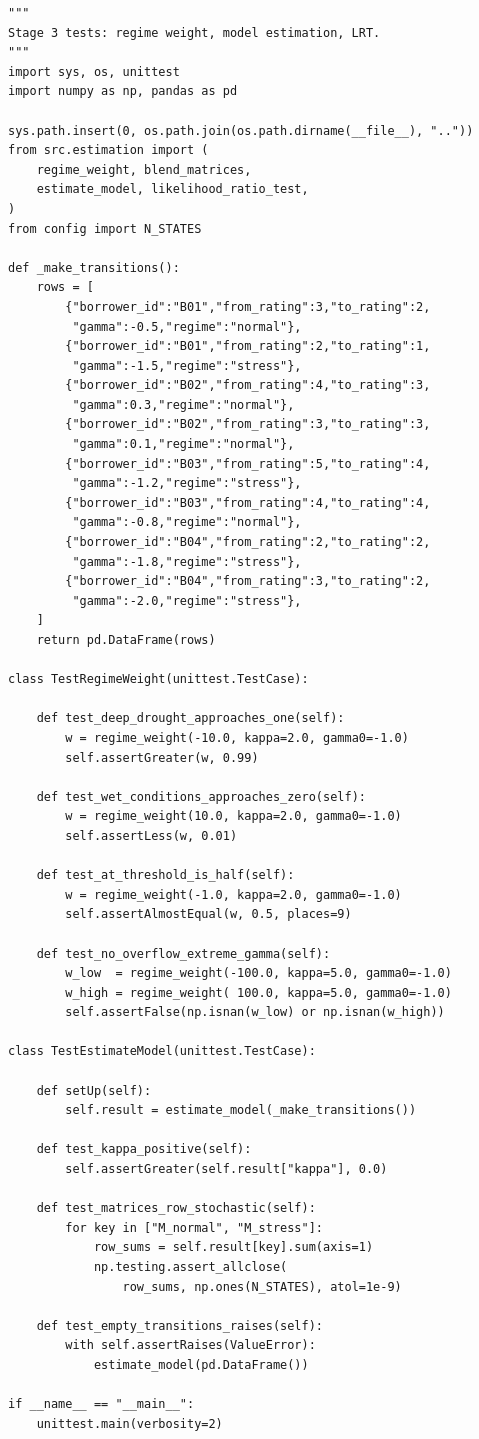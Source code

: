 \documentclass[12pt,a4paper]{article}
\begin{document}
\begin{lstlisting}[caption={test\_estimation.py --- Stage 3: Model Estimation}]
"""
Stage 3 tests: regime weight, model estimation, LRT.
"""
import sys, os, unittest
import numpy as np, pandas as pd

sys.path.insert(0, os.path.join(os.path.dirname(__file__), ".."))
from src.estimation import (
    regime_weight, blend_matrices,
    estimate_model, likelihood_ratio_test,
)
from config import N_STATES

def _make_transitions():
    rows = [
        {"borrower_id":"B01","from_rating":3,"to_rating":2,
         "gamma":-0.5,"regime":"normal"},
        {"borrower_id":"B01","from_rating":2,"to_rating":1,
         "gamma":-1.5,"regime":"stress"},
        {"borrower_id":"B02","from_rating":4,"to_rating":3,
         "gamma":0.3,"regime":"normal"},
        {"borrower_id":"B02","from_rating":3,"to_rating":3,
         "gamma":0.1,"regime":"normal"},
        {"borrower_id":"B03","from_rating":5,"to_rating":4,
         "gamma":-1.2,"regime":"stress"},
        {"borrower_id":"B03","from_rating":4,"to_rating":4,
         "gamma":-0.8,"regime":"normal"},
        {"borrower_id":"B04","from_rating":2,"to_rating":2,
         "gamma":-1.8,"regime":"stress"},
        {"borrower_id":"B04","from_rating":3,"to_rating":2,
         "gamma":-2.0,"regime":"stress"},
    ]
    return pd.DataFrame(rows)

class TestRegimeWeight(unittest.TestCase):

    def test_deep_drought_approaches_one(self):
        w = regime_weight(-10.0, kappa=2.0, gamma0=-1.0)
        self.assertGreater(w, 0.99)

    def test_wet_conditions_approaches_zero(self):
        w = regime_weight(10.0, kappa=2.0, gamma0=-1.0)
        self.assertLess(w, 0.01)

    def test_at_threshold_is_half(self):
        w = regime_weight(-1.0, kappa=2.0, gamma0=-1.0)
        self.assertAlmostEqual(w, 0.5, places=9)

    def test_no_overflow_extreme_gamma(self):
        w_low  = regime_weight(-100.0, kappa=5.0, gamma0=-1.0)
        w_high = regime_weight( 100.0, kappa=5.0, gamma0=-1.0)
        self.assertFalse(np.isnan(w_low) or np.isnan(w_high))

class TestEstimateModel(unittest.TestCase):

    def setUp(self):
        self.result = estimate_model(_make_transitions())

    def test_kappa_positive(self):
        self.assertGreater(self.result["kappa"], 0.0)

    def test_matrices_row_stochastic(self):
        for key in ["M_normal", "M_stress"]:
            row_sums = self.result[key].sum(axis=1)
            np.testing.assert_allclose(
                row_sums, np.ones(N_STATES), atol=1e-9)

    def test_empty_transitions_raises(self):
        with self.assertRaises(ValueError):
            estimate_model(pd.DataFrame())

if __name__ == "__main__":
    unittest.main(verbosity=2)
\end{lstlisting}
\end{document}
